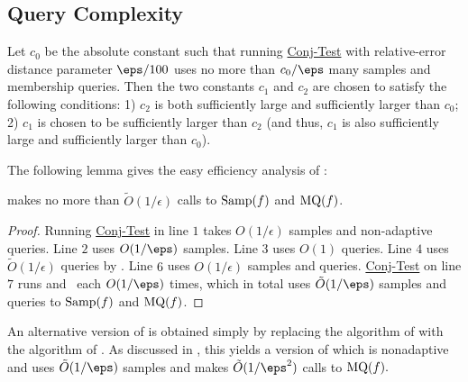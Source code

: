 \documentclass[11pt]{article}
\theoremstyle{definition}
\begin{document}
\subsection{Query Complexity}\label{sec:queryandnonadaptivity}

Let $c_0$ be the absolute constant such that running 
  \hyperlink{Algorithm2}{\sc Conj-Test} with relative-error distance
  parameter $\eps/100$ uses no more than $c_0/\eps$ many
  samples and membership queries.
Then the two constants $c_1$ and $c_2$ are chosen to satisfy the 
  following conditions:
 1) $c_2$ is both sufficiently large and sufficiently larger
  than $c_0$;
 2) $c_1$ is chosen to be sufficiently larger than $c_2$ (and thus, $c_1$ is also sufficiently large and sufficiently larger than $c_0$).

The following lemma gives the easy efficiency analysis of :
\begin{lemma}
      makes no more than $\tilde{O}(1/\epsilon)$ calls to $\mathrm{Samp}(f)$ and $\mathrm{MQ}(f)$.
\end{lemma}
\begin{proof}
    Running 
    \hyperlink{Algorithm2}{\sc Conj-Test}
in line $1$ takes $O(1/\epsilon)$ samples and non-adaptive queries. Line $2$ uses 
    ${O(1/\eps)}$
samples.
    Line {$3$} uses $O(1)$ queries. Line {$4$} uses $\tilde{O}(1/\epsilon )$ queries by . Line ${6}$ uses $O(1/\epsilon)$ samples and queries. 
\hyperlink{Algorithm2}{\sc Conj-Test}
    on line ${7}$ runs
     and ~each $O(1/\eps)$ times, which in total uses $\tilde{O}(1/\eps)$
    samples and queries to $\mathrm{Samp}(f)$ and $\mathrm{MQ}(f)$.
\end{proof}














\begin{remark} \label{remark:DL-nonadaptive}
An alternative version of  is obtained simply by replacing the algorithm of 
with the algorithm of .  As discussed in , this yields a version of  which is nonadaptive and uses $\tilde{O}(1/\eps)$ samples and makes $\tilde{O}(1/\eps^2)$ calls to $\mathrm{MQ}(f).$
\end{remark}
\end{document}
